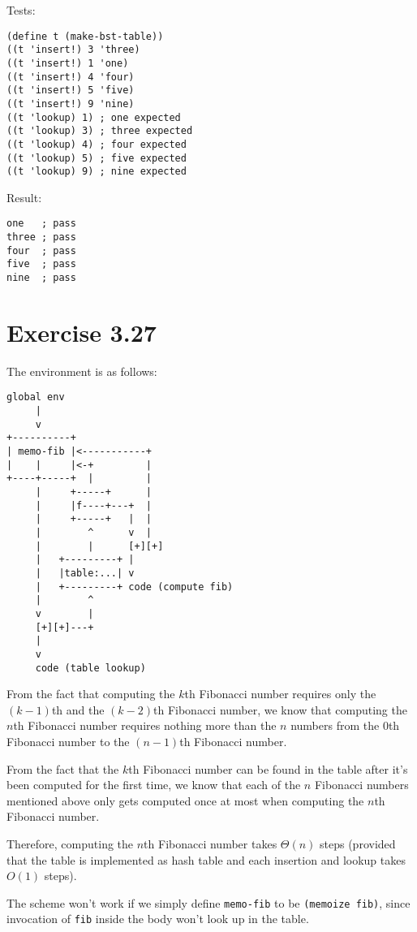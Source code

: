 \documentclass[../main.tex]{subfiles}
\begin{document}
Tests:

\begin{lstlisting}
(define t (make-bst-table))
((t 'insert!) 3 'three)
((t 'insert!) 1 'one)
((t 'insert!) 4 'four)
((t 'insert!) 5 'five)
((t 'insert!) 9 'nine)
((t 'lookup) 1) ; one expected
((t 'lookup) 3) ; three expected
((t 'lookup) 4) ; four expected
((t 'lookup) 5) ; five expected
((t 'lookup) 9) ; nine expected
\end{lstlisting}

Result:

\begin{lstlisting}
one   ; pass
three ; pass
four  ; pass
five  ; pass
nine  ; pass
\end{lstlisting}

\section{Exercise 3.27}

The environment is as follows:

\begin{lstlisting}
global env
     |
     v
+----------+
| memo-fib |<-----------+
|    |     |<-+         |
+----+-----+  |         |
     |     +-----+      |
     |     |f----+---+  |
     |     +-----+   |  |
     |        ^      v  |
     |        |      [+][+]
     |   +---------+ |
     |   |table:...| v
     |   +---------+ code (compute fib)
     |        ^
     v        |
     [+][+]---+
     |
     v
     code (table lookup)
\end{lstlisting}

From the fact that computing the $k$th
 Fibonacci number requires only the $(k-1)$th and the
 $(k-2)$th Fibonacci number, we know that computing
 the $n$th Fibonacci number requires nothing more
 than the $n$ numbers from the $0$th Fibonacci
 number to the $(n-1)$th Fibonacci number.

From the fact that the $k$th Fibonacci number
 can be found in the table after it's been computed
 for the first time, we know that each of the $n$
 Fibonacci numbers mentioned above only gets
 computed once at most when computing the $n$th
 Fibonacci number.

Therefore, computing the $n$th Fibonacci number
 takes $\Theta(n)$ steps (provided that the table
 is implemented as hash table and each insertion
 and lookup takes $O(1)$ steps).

The scheme won't work if we simply define
 \lstinline{memo-fib} to be
 \lstinline{(memoize fib)}, since invocation
 of \lstinline{fib} inside the body won't
 look up in the table.
\end{document}
